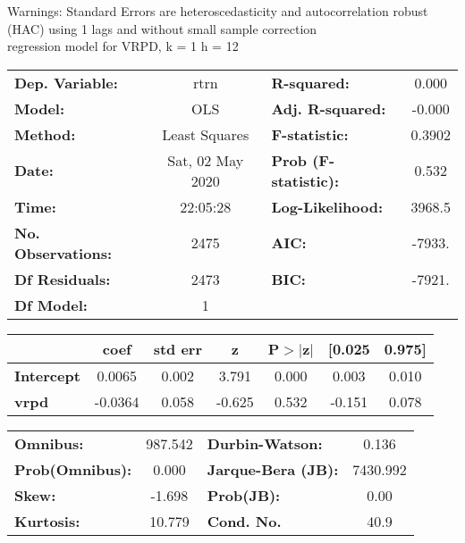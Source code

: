 Warnings: \newline
 [1] Standard Errors are heteroscedasticity and autocorrelation robust (HAC) using 1 lags and without small sample correction\\ 

regression model for VRPD, k = 1 h = 12\begin{center}
\begin{tabular}{lclc}
\toprule
\textbf{Dep. Variable:}    &       rtrn       & \textbf{  R-squared:         } &     0.000   \\
\textbf{Model:}            &       OLS        & \textbf{  Adj. R-squared:    } &    -0.000   \\
\textbf{Method:}           &  Least Squares   & \textbf{  F-statistic:       } &    0.3902   \\
\textbf{Date:}             & Sat, 02 May 2020 & \textbf{  Prob (F-statistic):} &    0.532    \\
\textbf{Time:}             &     22:05:28     & \textbf{  Log-Likelihood:    } &    3968.5   \\
\textbf{No. Observations:} &        2475      & \textbf{  AIC:               } &    -7933.   \\
\textbf{Df Residuals:}     &        2473      & \textbf{  BIC:               } &    -7921.   \\
\textbf{Df Model:}         &           1      & \textbf{                     } &             \\
\bottomrule
\end{tabular}
\begin{tabular}{lcccccc}
                   & \textbf{coef} & \textbf{std err} & \textbf{z} & \textbf{P$> |$z$|$} & \textbf{[0.025} & \textbf{0.975]}  \\
\midrule
\textbf{Intercept} &       0.0065  &        0.002     &     3.791  &         0.000        &        0.003    &        0.010     \\
\textbf{vrpd}      &      -0.0364  &        0.058     &    -0.625  &         0.532        &       -0.151    &        0.078     \\
\bottomrule
\end{tabular}
\begin{tabular}{lclc}
\textbf{Omnibus:}       & 987.542 & \textbf{  Durbin-Watson:     } &    0.136  \\
\textbf{Prob(Omnibus):} &   0.000 & \textbf{  Jarque-Bera (JB):  } & 7430.992  \\
\textbf{Skew:}          &  -1.698 & \textbf{  Prob(JB):          } &     0.00  \\
\textbf{Kurtosis:}      &  10.779 & \textbf{  Cond. No.          } &     40.9  \\
\bottomrule
\end{tabular}
\end{center}

